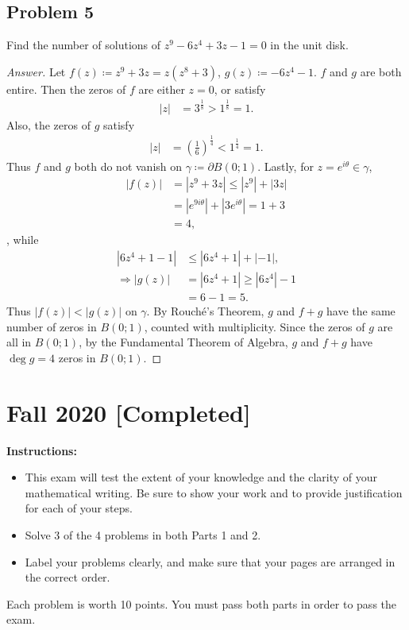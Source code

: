 \documentclass[12pt]{article}
\newcommand\paren[1]{\left( #1 \right)}
\newcommand{\abs}[1]{\left| #1 \right|}
\theoremstyle{definition}
\begin{document}
\subsection{Problem 5}
Find the number of solutions of $z^9 - 6z^4 + 3z - 1 = 0$ in the unit disk.
\begin{proof}[Answer]
    Let $f(z) \coloneqq z^9 + 3z = z\paren{z^8+3}$, $g(z) \coloneqq -6z^4 - 1$. $f$ and $g$ are both entire. Then the zeros of $f$ are either $z = 0$, or satisfy 
    \begin{align*}
        |z| & = 3^{\frac{1}{8}} > 1^{\frac{1}{8}} = 1.
    \end{align*}
    Also, the zeros of $g$ satisfy
    \begin{align*}
        |z| & = \paren{ \frac{1}{6} }^{\frac{1}{4}} < 1^{\frac{1}{4}} = 1.
    \end{align*}
    Thus $f$ and $g$ both do not vanish on $\gamma \coloneqq \partial B(0;1)$. Lastly, for $z = e^{i\theta} \in \gamma$,
    \begin{align*}
        \abs{ f(z) } & = \abs{ z^9 + 3z } \leq \abs{ z^9 } + \abs{ 3z } \\
        & = \abs{ e^{9i\theta} } + \abs{ 3e^{i\theta} } = 1 + 3 \\
        & = 4,
    \end{align*},
    while 
    \begin{align*}
        \abs{ 6z^4 + 1 - 1 } & \leq \abs{ 6z^4 + 1 } + \abs{-1}, \\
        \Rightarrow \abs{ g(z) } & = \abs{ 6z^4 + 1 } \geq \abs{ 6z^4 } - 1 \\
        & = 6 - 1 = 5.
    \end{align*}
    Thus $\abs{ f(z) } < \abs{ g(z) }$ on $\gamma$. By Rouch\'e's Theorem, $g$ and $f + g$ have the same number of zeros in $B(0;1)$, counted with multiplicity. Since the zeros of $g$ are all in $B(0;1)$, by the Fundamental Theorem of Algebra, $g$ and $f + g$ have $\deg g = 4$ zeros in $B(0;1)$.
\end{proof}
\newpage
\section{Fall 2020 [Completed]}
\noindent \textbf{Instructions:}
\begin{itemize}
    \item This exam will test the extent of your knowledge and the clarity of your mathematical writing. Be sure to show your work and to provide justification for each of your steps.
    \item Solve 3 of the 4 problems in both Parts 1 and 2.
    \item Label your problems clearly, and make sure that your pages are arranged in the correct order.
\end{itemize}
Each problem is worth 10 points. You must pass both parts in order to pass the exam.
\end{document}
